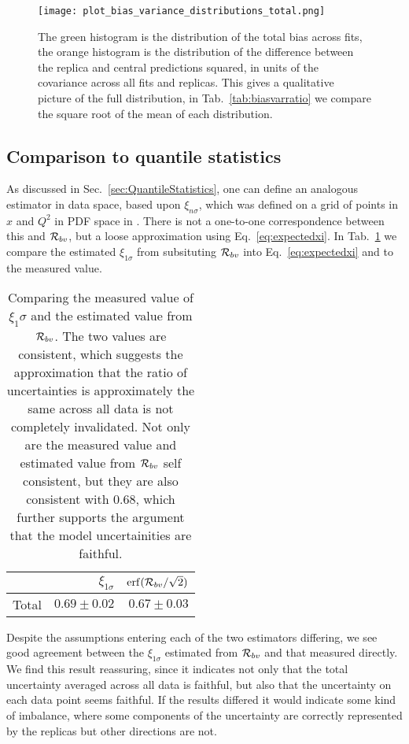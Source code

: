 \begin{figure}[ht]
    \centering
    \texttt{[image: plot\_bias\_variance\_distributions\_total.png]}
    \caption{The green histogram is the distribution of the total bias across fits,
    the orange histogram is the distribution of the difference between the
    replica and central predictions squared, in units of the covariance
    across all fits and replicas. This gives a qualitative picture of the full
    distribution, in Tab.~\ref{tab:biasvarratio} we compare the square root of the
    mean of each distribution.}
\end{figure}

\subsection{Comparison to quantile statistics}

As discussed in Sec.~\ref{sec:QuantileStatistics}, one can define an analogous
estimator in data space, based upon $\xi_{n\sigma}$, which was defined on a grid
of points in $x$ and $Q^2$ in PDF space in \cite{nnpdf30}. There is not
a one-to-one correspondence
between this and $\mathcal{R}_{bv}$, but a loose approximation using
Eq.~\ref{eq:expectedxi}. In Tab.~\ref{tab:xicomparison} we compare the estimated
$\xi_{1\sigma}$ from
subsituting $\mathcal{R}_{bv}$ into Eq.~\ref{eq:expectedxi} and to the
measured value.

\begin{table}[hb]
    \begin{center}
        \begin{tabular}{lrr}
            \toprule
            {}     & $\xi_{1\sigma}$ & ${\rm erf}(\mathcal{R}_{bv}/\sqrt{2})$ \\
            \midrule
            Total  & $0.69\pm0.02$   & $0.67\pm0.03$                  \\
            \bottomrule
            \end{tabular}
    \end{center}
    \caption{
        Comparing the measured value of $\xi_1\sigma$ and the estimated
        value from $\mathcal{R}_{bv}$. The two values are consistent, which
        suggests the approximation that the ratio of uncertainties is
        approximately the same across all data is not completely invalidated.
        Not only are the measured value and estimated value from $\mathcal{R}_{bv}$
        self consistent, but they are also consistent with $0.68$, which
        further supports the argument that the model uncertainities are
        faithful.
    }
    \label{tab:xicomparison}
\end{table}

Despite the assumptions entering each of the two estimators differing, we see
good agreement between the $\xi_{1\sigma}$ estimated from $\mathcal{R}_{bv}$
and that measured directly. We find this result reassuring, since it indicates
not only that the total uncertainty averaged across all data is faithful, but
also that the uncertainty on each data point seems faithful. If the results
differed it would indicate some kind of imbalance, where some components
of the uncertainty are correctly represented by the replicas but other directions
are not.

